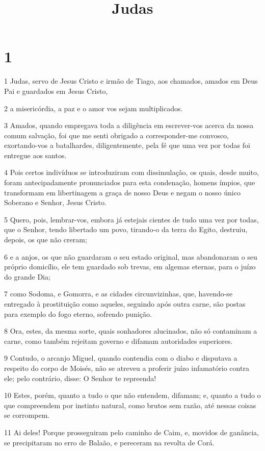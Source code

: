 

\title{Judas}


\chapter{1}

\par 1 Judas, servo de Jesus Cristo e irmão de Tiago, aos chamados, amados em Deus Pai e guardados em Jesus Cristo,
\par 2 a misericórdia, a paz e o amor vos sejam multiplicados.
\par 3 Amados, quando empregava toda a diligência em escrever-vos acerca da nossa comum salvação, foi que me senti obrigado a corresponder-me convosco, exortando-vos a batalhardes, diligentemente, pela fé que uma vez por todas foi entregue aos santos.
\par 4 Pois certos indivíduos se introduziram com dissimulação, os quais, desde muito, foram antecipadamente pronunciados para esta condenação, homens ímpios, que transformam em libertinagem a graça de nosso Deus e negam o nosso único Soberano e Senhor, Jesus Cristo.
\par 5 Quero, pois, lembrar-vos, embora já estejais cientes de tudo uma vez por todas, que o Senhor, tendo libertado um povo, tirando-o da terra do Egito, destruiu, depois, os que não creram;
\par 6 e a anjos, os que não guardaram o seu estado original, mas abandonaram o seu próprio domicílio, ele tem guardado sob trevas, em algemas eternas, para o juízo do grande Dia;
\par 7 como Sodoma, e Gomorra, e as cidades circunvizinhas, que, havendo-se entregado à prostituição como aqueles, seguindo após outra carne, são postas para exemplo do fogo eterno, sofrendo punição.
\par 8 Ora, estes, da mesma sorte, quais sonhadores alucinados, não só contaminam a carne, como também rejeitam governo e difamam autoridades superiores.
\par 9 Contudo, o arcanjo Miguel, quando contendia com o diabo e disputava a respeito do corpo de Moisés, não se atreveu a proferir juízo infamatório contra ele; pelo contrário, disse: O Senhor te repreenda!
\par 10 Estes, porém, quanto a tudo o que não entendem, difamam; e, quanto a tudo o que compreendem por instinto natural, como brutos sem razão, até nessas coisas se corrompem.
\par 11 Ai deles! Porque prosseguiram pelo caminho de Caim, e, movidos de ganância, se precipitaram no erro de Balaão, e pereceram na revolta de Corá.
